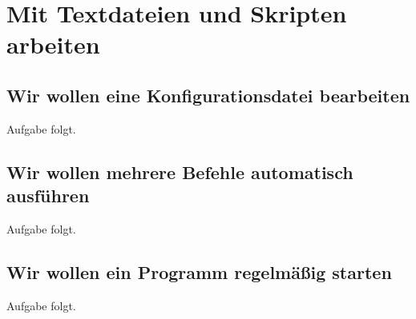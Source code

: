 \part{Mit Textdateien und Skripten arbeiten}

\chapter{Wir wollen eine Konfigurationsdatei bearbeiten}


\kapitelstruktur

\begin{aufgabeBox}
Aufgabe folgt.
\end{aufgabeBox}


\chapter{Wir wollen mehrere Befehle automatisch ausführen}


\kapitelstruktur

\begin{aufgabeBox}
Aufgabe folgt.
\end{aufgabeBox}


\chapter{Wir wollen ein Programm regelmäßig starten}


\kapitelstruktur

\begin{aufgabeBox}
Aufgabe folgt.
\end{aufgabeBox}


